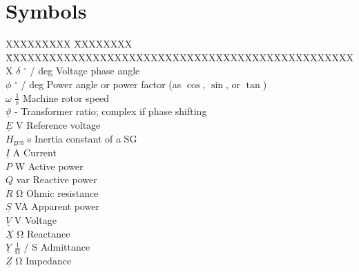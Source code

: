 \chapter*{Symbols}
\label{chap:symbols}

\begin{tabbing}
    XXXXXXXXX \= XXXXXXXX \= XXXXXXXXXXXXXXXXXXXXXXXXXXXXXXXXXXXXXXXXXXXXXXXXX \kill
    $\delta$                \> $^\circ$ / deg                   \> Voltage phase angle \\
    $\phi$                  \> $^\circ$ / deg                   \> Power angle or power factor (as $\cos$, $\sin$, or $\tan$) \\
    $\omega$                \> $\mathrm{\frac{1}{s}}$           \> Machine rotor speed \\
    $\underline{\vartheta}$ \> -                                \> Transformer ratio; complex if phase shifting \\
    $\underline{E}$         \> V                                \> Reference voltage \\
    $H_\mathrm{gen}$        \> s                                \> Inertia constant of a \acf{SG} \\
    $\underline{I}$         \> A                                \> Current \\
    $P$                     \> W                                \> Active power\\
    $Q$                     \> var                              \> Reactive power \\
    $R$                     \> $\mathrm{\Omega}$                \> Ohmic resistance \\
    $\underline{S}$         \> VA                               \> Apparent power \\
    $\underline{V}$         \> V                                \> Voltage \\
    $\underline{X}$         \> $\mathrm{\Omega}$                \> Reactance \\
    $\underline{Y}$         \> $\mathrm{\frac{1}{\Omega}}$ / S  \> Admittance \\
    $\underline{Z}$         \> $\mathrm{\Omega}$                \> Impedance \\
\end{tabbing}

